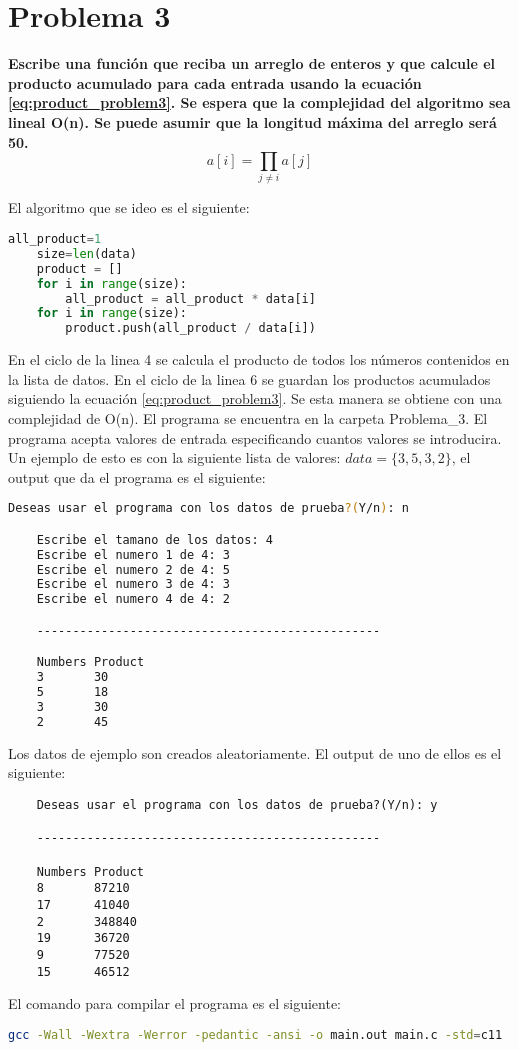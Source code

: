 \section*{Problema 3}
\textbf{Escribe una función que reciba un arreglo de enteros y que calcule el producto acumulado para cada entrada usando la ecuación \ref{eq:product_problem3}. Se espera que la complejidad del algoritmo sea lineal O(n). Se puede asumir que la longitud máxima del arreglo será 50.}
\begin{equation}
    a[i] = \prod_{j\neq i} a[j]
    \label{eq:product_problem3}
\end{equation}

El algoritmo que se ideo es el siguiente:

\begin{lstlisting}[language=python]
    all_product=1
    size=len(data)
    product = []
    for i in range(size):
        all_product = all_product * data[i]
    for i in range(size):
        product.push(all_product / data[i])
\end{lstlisting}

En el ciclo de la linea 4 se calcula el producto de todos los números contenidos en la lista de datos. En el ciclo de la linea 6 se guardan los productos acumulados siguiendo la ecuación \ref{eq:product_problem3}. Se esta manera se obtiene con una complejidad de O(n). El programa se encuentra en la carpeta \textcolor{citecolor}{Problema\_3}. El programa acepta valores de entrada especificando cuantos valores se introducira. Un ejemplo de esto es con la siguiente lista de valores: $data=\{3,5,3,2\}$, el output que da el programa es el siguiente:

\begin{lstlisting}[language=bash]
    Deseas usar el programa con los datos de prueba?(Y/n): n

    Escribe el tamano de los datos: 4
    Escribe el numero 1 de 4: 3
    Escribe el numero 2 de 4: 5
    Escribe el numero 3 de 4: 3
    Escribe el numero 4 de 4: 2

    ------------------------------------------------

    Numbers	Product
    3		30
    5		18
    3		30
    2		45
\end{lstlisting}

Los datos de ejemplo son creados aleatoriamente. El output de uno de ellos es el siguiente:

\begin{lstlisting}
    Deseas usar el programa con los datos de prueba?(Y/n): y

    ------------------------------------------------

    Numbers	Product
    8		87210
    17		41040
    2		348840
    19		36720
    9		77520
    15		46512
\end{lstlisting}

El comando para compilar el programa es el siguiente:

\begin{lstlisting}[language=bash]
    gcc -Wall -Wextra -Werror -pedantic -ansi -o main.out main.c -std=c11
\end{lstlisting}